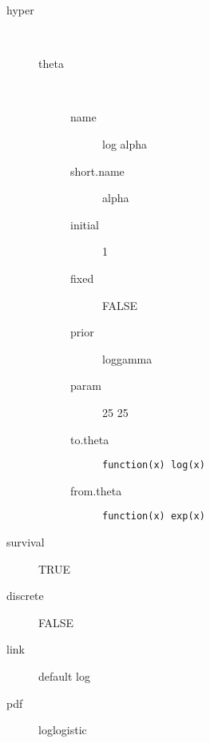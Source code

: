 \begin{description}
	\item[hyper]\ 
	 \begin{description}
	 	\item[theta]\ 
	 	 \begin{description}
	 	 	\item[name] log alpha
	 	 	\item[short.name] alpha
	 	 	\item[initial] 1
	 	 	\item[fixed] FALSE
	 	 	\item[prior] loggamma
	 	 	\item[param] 25 25
	 	 	\item[to.theta] \verb|function(x) log(x)|
	 	 	\item[from.theta] \verb|function(x) exp(x)|
	 	 \end{description}
	 \end{description}
	\item[survival] TRUE
	\item[discrete] FALSE
	\item[link] default log
	\item[pdf] loglogistic
\end{description}
